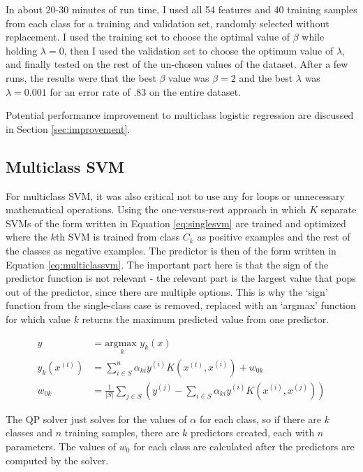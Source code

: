 \documentclass[10pt]{article}
\begin{document}
In about 20-30 minutes of run time, I used all 54 features and 40 training samples from each class for a training and validation set, randomly selected without replacement. I used the training set to choose the optimal value of $\beta$ while holding $\lambda = 0$, then I used the validation set to choose the optimum value of $\lambda$, and finally tested on the rest of the un-chosen values of the dataset. After a few runs, the results were that the best $\beta$ value was $\beta = 2$ and the best $\lambda$ was $\lambda = 0.001$ for an error rate of $.83$ on the entire dataset.

Potential performance improvement to multiclass logistic regression are discussed in Section \ref{sec:improvement}.

\subsection{Multiclass SVM}

For multiclass SVM, it was also critical not to use any for loops or unnecessary mathematical operations. Using the one-versus-rest approach in which $K$ separate SVMs of the form written in Equation \ref{eq:singlesvm} are trained and optimized where the $k$th SVM is trained from class $C_k$ as positive examples and the rest of the classes as negative examples. The predictor is then of the form written in Equation \ref{eq:multiclassvm}. The important part here is that the sign of the predictor function is not relevant - the relevant part is the largest value that pops out of the predictor, since there are multiple options. This is why the `sign' function from the single-class case is removed, replaced with an `argmax' function for which value $k$ returns the maximum predicted value from one predictor.

\begin{subequations}
	\begin{align}
		y &= \underset{k}{\text{argmax }} y_k(x) \\
		y_k (x^{(t)}) &= \sum_{i \in S}^n \alpha_{ki} y^{(i)} K(x^{(t)}, x^{(i)}) + w_{0k} \\
		w_{0k} &= \frac{1}{|S|} \sum_{j \in S} \left(y^{(j)} - \sum_{i \in S} \alpha_{ki} y^{(i)} K(x^{(i)}, x^{(j)}) \right)
	\end{align}
	\label{eq:multiclassvm}
\end{subequations}

The QP solver just solves for the values of $\alpha$ for each class, so if there are $k$ classes and $n$ training samples, there are $k$ predictors created, each with $n$ parameters. The values of $w_0$ for each class are calculated after the predictors are computed by the solver. 
\end{document}
